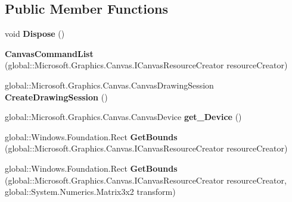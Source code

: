 \subsection*{Public Member Functions}
\begin{DoxyCompactItemize}
\item 
\mbox{\label{class_microsoft_1_1_graphics_1_1_canvas_1_1_canvas_command_list_a26eecdc2e1e50ca004cd6ffbf3197786}} 
void {\bfseries Dispose} ()
\item 
\mbox{\label{class_microsoft_1_1_graphics_1_1_canvas_1_1_canvas_command_list_aa46aea923e0f8ed09d7c228ee0994a3d}} 
{\bfseries Canvas\+Command\+List} (global\+::\+Microsoft.\+Graphics.\+Canvas.\+I\+Canvas\+Resource\+Creator resource\+Creator)
\item 
\mbox{\label{class_microsoft_1_1_graphics_1_1_canvas_1_1_canvas_command_list_a4e6b387525b4db49e0c679aec814bc6d}} 
global\+::\+Microsoft.\+Graphics.\+Canvas.\+Canvas\+Drawing\+Session {\bfseries Create\+Drawing\+Session} ()
\item 
\mbox{\label{class_microsoft_1_1_graphics_1_1_canvas_1_1_canvas_command_list_afa1a1ee6bf0b44a69cd7ec45df0b6d49}} 
global\+::\+Microsoft.\+Graphics.\+Canvas.\+Canvas\+Device {\bfseries get\+\_\+\+Device} ()
\item 
\mbox{\label{class_microsoft_1_1_graphics_1_1_canvas_1_1_canvas_command_list_aca6d1c6135ba1dfb533e1ea91fc93a51}} 
global\+::\+Windows.\+Foundation.\+Rect {\bfseries Get\+Bounds} (global\+::\+Microsoft.\+Graphics.\+Canvas.\+I\+Canvas\+Resource\+Creator resource\+Creator)
\item 
\mbox{\label{class_microsoft_1_1_graphics_1_1_canvas_1_1_canvas_command_list_af2772a00b0012fc90598d8cf5789f357}} 
global\+::\+Windows.\+Foundation.\+Rect {\bfseries Get\+Bounds} (global\+::\+Microsoft.\+Graphics.\+Canvas.\+I\+Canvas\+Resource\+Creator resource\+Creator, global\+::\+System.\+Numerics.\+Matrix3x2 transform)

\end{DoxyCompactItemize}
